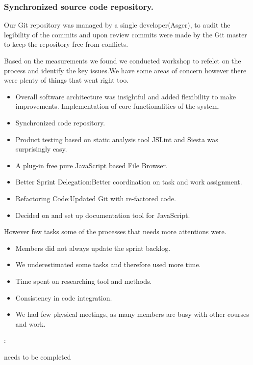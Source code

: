 \subsubsection{Synchronized source code repository.} %
\label{ssub:Synchronized source code repository.}

Our Git repository was managed by a single developer(Asger), to audit the legibility of the commits and upon review commits were made by the Git master to keep the repository free from conflicts.

Based on the measurements we found we conducted workshop to refelct on the process and identify the key issues.We have  some areas of concern however there were plenty of things that went right too.

\begin{itemize}
	\item	Overall software architecture was insightful and added flexibility to make improvements. Implementation of core functionalities of  the system.
	\item	Synchronized code repository.
	\item	Product testing based on static analysis tool JSLint and Siesta was surprisingly easy.
	\item	A plug-in free pure JavaScript based File Browser.
	\item	Better Sprint Delegation:Better coordination on task and work assignment.
	\item	Refactoring Code:Updated Git with re-factored code.
	\item	Decided on and set up documentation tool for JavaScript.

\end{itemize}

However few tasks some of the processes that needs more attentions were.
\begin{itemize}
	\item Members did not always update the sprint backlog.
	\item We underestimated some tasks and therefore used more time.
	\item Time spent on researching tool and methods.
	\item Consistency in code integration.
	\item We had few physical meetings, as many members are busy with other courses and work.
\end{itemize}



 :


needs to be completed
